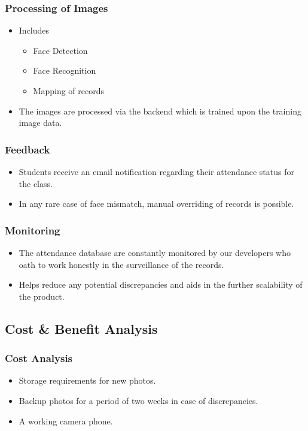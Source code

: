 \documentclass[a4paper,12pt]{article}
\begin{document}
\subsubsection{Processing of Images}
\begin{itemize}
    \item Includes \begin{itemize}
        \item Face Detection
        \item Face Recognition
        \item Mapping of records
    \end{itemize}
    \item The images are processed via the backend which is trained upon the training image data.
\end{itemize}

\subsubsection{Feedback}
\begin{itemize}
    \item Students receive an email notification regarding their attendance status for the class.
    \item In any rare case of face mismatch, manual overriding of records is possible.
\end{itemize}

\subsubsection{Monitoring}
\begin{itemize}
    \item The attendance database are constantly monitored by our developers who oath to work honestly in the surveillance of the records.
    \item Helps reduce any potential discrepancies and aids in the further scalability of the product.
\end{itemize}

\subsection{Cost \& Benefit Analysis}
\subsubsection{Cost Analysis}
\begin{itemize}
    \item Storage requirements for new photos.
    \item Backup photos for a period of two weeks in case of discrepancies.
    \item A working camera phone.
\end{itemize}
\end{document}
